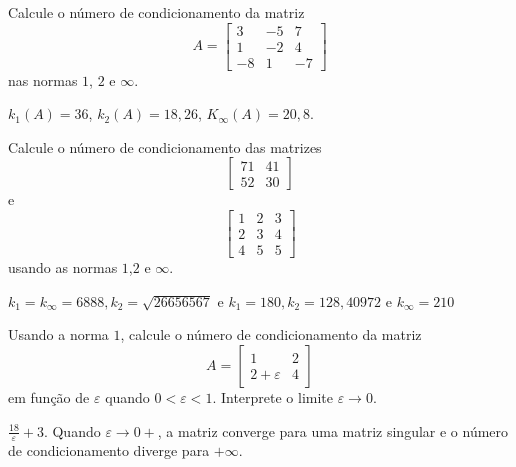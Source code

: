 \begin{exer}
  Calcule o número de condicionamento da matriz
$$A=\left[
\begin{array}{ccc}
3 & -5 & 7\\
1 & -2 & 4\\
-8 & 1 & -7
\end{array}
\right]$$
nas normas $1$, $2$ e $\infty$.
\end{exer}
\begin{resp}
  
  $k_1(A)=36$, $k_2(A)=18,26$, $K_\infty(A)=20,8$.  
  
\end{resp}

\begin{exer} Calcule o número de condicionamento das matrizes
$$\left[
\begin{array}{cc}
71 & 41\\
52 & 30
\end{array}\right]$$
e
$$\left[
\begin{array}{ccc}
1 & 2 & 3\\
2 & 3 & 4\\
4 & 5 & 5
\end{array}\right]$$
usando as normas $1$,$2$ e $\infty$.
\end{exer}
\begin{resp}
  
$k_1=k_\infty=6888, k_2=\sqrt{26656567}$ e $k_1=180, k_2= 128,40972  $ e $k_\infty=210$    
  
\end{resp}

\begin{exer}Usando a norma $1$, calcule o número de condicionamento da matriz
$$A=\left[
\begin{array}{cc}
1 & 2\\
2+\varepsilon & 4
\end{array}\right]$$
em função de $\varepsilon$ quando $0<\varepsilon<1$. Interprete o limite $\varepsilon\to 0$.
\end{exer}
\begin{resp}
  
 $\frac{18}{\varepsilon}+3$. Quando $\varepsilon\to 0+$, a matriz converge para uma matriz singular e o número de condicionamento diverge para $+\infty$.    
  
\end{resp}

